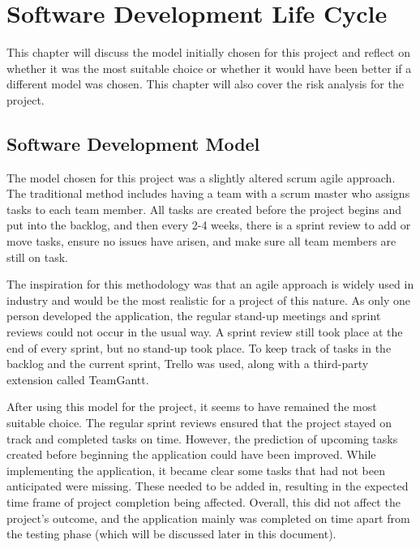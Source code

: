 \chapter{Software Development Life Cycle}
	\label{chap:sdl}
	This chapter will discuss the model initially chosen for this project and reflect on whether it was the most suitable choice or whether it would have been better if a different model was chosen.  This chapter will also cover the risk analysis for the project.
	
    \section{Software Development Model}
        \label{sec:sdl_model_chosen}
        The model chosen for this project was a slightly altered scrum agile approach.  The traditional method includes having a team with a scrum master who assigns tasks to each team member.  All tasks are created before the project begins and put into the backlog, and then every 2-4 weeks, there is a sprint review to add or move tasks, ensure no issues have arisen, and make sure all team members are still on task\cite{sommerville_2018}.
        
        
        
        The inspiration for this methodology was that an agile approach is widely used in industry and would be the most realistic for a project of this nature.  As only one person developed the application, the regular stand-up meetings and sprint reviews could not occur in the usual way.  A sprint review still took place at the end of every sprint, but no stand-up took place.  To keep track of tasks in the backlog and the current sprint, Trello was used, along with a third-party extension called TeamGantt.
        
        
        
        After using this model for the project, it seems to have remained the most suitable choice.  The regular sprint reviews ensured that the project stayed on track and completed tasks on time.  However, the prediction of upcoming tasks created before beginning the application could have been improved.  While implementing the application, it became clear some tasks that had not been anticipated were missing. These needed to be added in, resulting in the expected time frame of project completion being affected.  Overall, this did not affect the project's outcome, and the application mainly was completed on time apart from the testing phase (which will be discussed later in this document).
        
